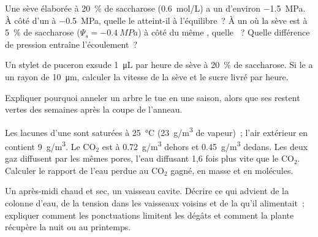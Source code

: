 \begin{exercise}[$\star\star$]\label{exo:b1:plant-transport:7}
Une sève élaborée à \qty{20}{\%} de saccharose (\qty{0.6}{mol/L}) a un
 d'environ \qty{-1.5}{MPa}. À côté d'un  à
\qty{-0.5}{MPa}, quelle  le  atteint-il à
l'équilibre~? À un  où la sève est à \qty{5}{\%} de saccharose
($\Psi_s = \qty{-0.4}{MPa}$) à côté du même , quelle ~?
Quelle différence de pression entraîne l'écoulement~?
\end{exercise}

\begin{exercise}[$\star\star$]\label{exo:b1:plant-transport:8}
Un stylet de puceron exsude \qty{1}{\micro L} par heure de sève à
\qty{20}{\%} de saccharose. Si le  a un rayon de
\qty{10}{\micro m}, calculer la vitesse de la sève et le sucre livré
par heure.
\end{exercise}

\begin{exercise}[$\star\star$]\label{exo:b1:plant-transport:9}
Expliquer pourquoi anneler un arbre le tue en une saison, alors que
ses  restent vertes des semaines après la coupe de l'anneau.
\end{exercise}

\begin{exercise}[$\star\star\star$]\label{exo:b1:plant-transport:10}
Les lacunes d'une  sont saturées à \qty{25}{\celsius}
(\qty{23}{g/m^3} de vapeur)~; l'air extérieur en contient
\qty{9}{g/m^3}. Le $\mathrm{CO_2}$ est à \qty{0.72}{g/m^3} dehors et
\qty{0.45}{g/m^3} dedans. Les deux gaz diffusent par les mêmes pores,
l'eau diffusant 1,6 fois plus vite que le $\mathrm{CO_2}$. Calculer le
rapport de l'eau perdue au $\mathrm{CO_2}$ gagné, en masse et en
molécules.
\end{exercise}

\begin{exercise}[$\star\star\star$]\label{exo:b1:plant-transport:11}
Un après-midi chaud et sec, un vaisseau cavite. Décrire ce qui advient
de la colonne d'eau, de la tension dans les vaisseaux voisins et de la
 qu'il alimentait~; expliquer comment les ponctuations limitent
les dégâts et comment la plante récupère la nuit ou au printemps.
\end{exercise}

